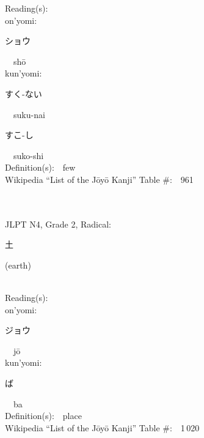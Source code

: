 \begin{multicols}{2}
Reading(s):\ \ \\
{\hspace*{1em}}on'yomi:\ \ \\
{\hspace*{2em}}{\begin{CJK}{UTF8}{min} ショウ \end{CJK}}\ \ sh\=o\ \ \\
{\hspace*{1em}}kun'yomi:\ \ \\
{\hspace*{2em}}{\begin{CJK}{UTF8}{min} すく-ない \end{CJK}}\ \ suku-nai\ \ \\
{\hspace*{2em}}{\begin{CJK}{UTF8}{min} すこ-し \end{CJK}}\ \ suko-shi\ \ \\
Definition(s):\ \ few \\
Wikipedia ``List of the J\=oy\=o Kanji'' Table \#:\ \ 961 \\
\ \ \\
{\fontsize{34pt}{40pt}  }\ \ \\  %
{JLPT N4, Grade 2, Radical:\ \ {\begin{CJK}{UTF8}{min} 土 \end{CJK}} (earth) } \\
Reading(s):\ \ \\
{\hspace*{1em}}on'yomi:\ \ \\
{\hspace*{2em}}{\begin{CJK}{UTF8}{min} ジョウ \end{CJK}}\ \ j\=o\ \ \\
{\hspace*{1em}}kun'yomi:\ \ \\
{\hspace*{2em}}{\begin{CJK}{UTF8}{min} ば \end{CJK}}\ \ ba\ \ \\
Definition(s):\ \ place \\
Wikipedia ``List of the J\=oy\=o Kanji'' Table \#:\ \ 1\,020 \\
\ \ \\

\end{multicols}
